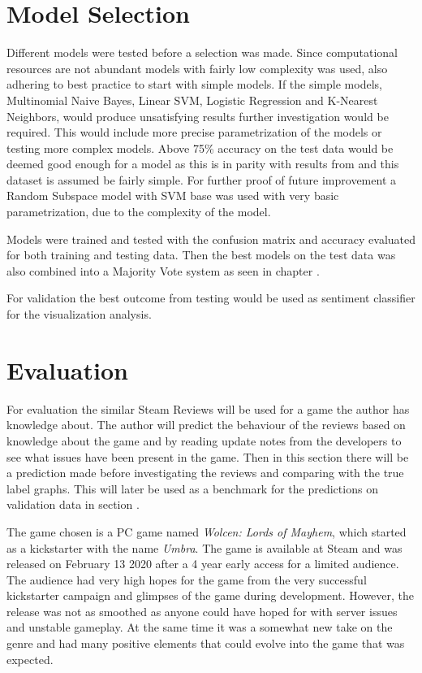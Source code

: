 \section{Model Selection}
\label{sec:model-selection}


Different models were tested before a selection was made. 
Since computational resources are not abundant models with fairly low complexity was used, also adhering to best practice to start with simple models.
If the simple models, Multinomial Naive Bayes, Linear SVM, Logistic Regression and K-Nearest Neighbors, would produce unsatisfying results further investigation would be required.
This would include more precise parametrization of the models or testing more complex models. 
Above 75\% accuracy on the test data would be deemed good enough for a model as this is in parity with results from \cite{gang-wang, rui-xia} and this dataset is assumed be fairly simple. 
For further proof of future improvement a Random Subspace model with SVM base was used with very basic parametrization, due to the complexity of the model.


Models were trained and tested with the confusion matrix and accuracy evaluated for both training and testing data.
Then the best models on the test data was also combined into a Majority Vote system as seen in chapter .


For validation the best outcome from testing would be used as sentiment classifier for the visualization analysis.


\section{Evaluation}
\label{sec:evaluation}


For evaluation the similar Steam Reviews will be used for a game the author has knowledge about. 
The author will predict the behaviour of the reviews based on knowledge about the game and by reading update notes from the developers to see what issues have been present in the game. 
Then in this section there will be a prediction made before investigating the reviews and comparing with the true label graphs. 
This will later be used as a benchmark for the predictions on validation data in section .


The game chosen is a PC game named \emph{Wolcen: Lords of Mayhem}, which started as a kickstarter with the name \emph{Umbra}. \cite{kickstarter} 
The game is available at Steam \cite{wolcen} and was released on February 13 2020 after a 4 year early access for a limited audience. 
The audience had very high hopes for the game from the very successful kickstarter campaign and glimpses of the game during development. 
However, the release was not as smoothed as anyone could have hoped for with server issues and unstable gameplay. 
At the same time it was a somewhat new take on the genre and had many positive elements that could evolve into the game that was expected. 


